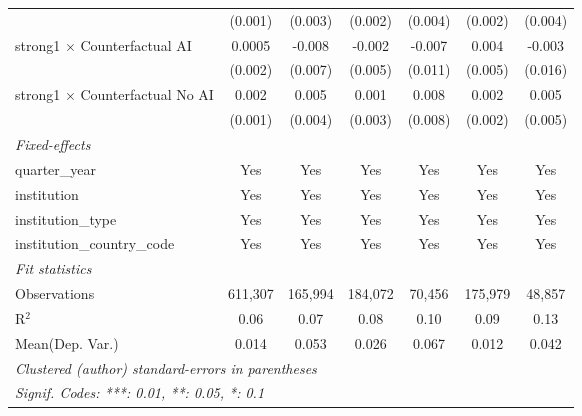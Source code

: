 \begin{tabular}{lcccccc}
                                          & (0.001)        & (0.003)        & (0.002)        & (0.004)        & (0.002)       & (0.004)\\   
   strong1 $\times$ Counterfactual AI     & 0.0005         & -0.008         & -0.002         & -0.007         & 0.004         & -0.003\\   
                                          & (0.002)        & (0.007)        & (0.005)        & (0.011)        & (0.005)       & (0.016)\\   
   strong1 $\times$ Counterfactual No AI  & 0.002          & 0.005          & 0.001          & 0.008          & 0.002         & 0.005\\   
                                          & (0.001)        & (0.004)        & (0.003)        & (0.008)        & (0.002)       & (0.005)\\   
   \midrule
   \emph{Fixed-effects}\\
   quarter\_year                          & Yes            & Yes            & Yes            & Yes            & Yes           & Yes\\  
   institution                            & Yes            & Yes            & Yes            & Yes            & Yes           & Yes\\  
   institution\_type                      & Yes            & Yes            & Yes            & Yes            & Yes           & Yes\\  
   institution\_country\_code             & Yes            & Yes            & Yes            & Yes            & Yes           & Yes\\  
   \midrule
   \emph{Fit statistics}\\
   Observations                           & 611,307        & 165,994        & 184,072        & 70,456         & 175,979       & 48,857\\  
   R$^2$                                  & 0.06           & 0.07           & 0.08           & 0.10           & 0.09          & 0.13\\  
Mean(Dep. Var.) & 0.014 & 0.053 & 0.026 & 0.067 & 0.012 & 0.042 \\
   \midrule \midrule
   \multicolumn{7}{l}{\emph{Clustered (author) standard-errors in parentheses}}\\
   \multicolumn{7}{l}{\emph{Signif. Codes: ***: 0.01, **: 0.05, *: 0.1}}\\
\end{tabular}
\par\endgroup
